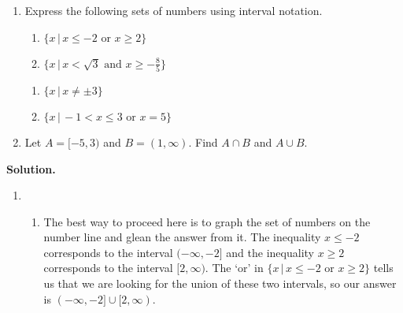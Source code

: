 \documentclass{ximera}
\begin{document}
\begin{example} \label{intervalex} $~$

\begin{enumerate} \item Express the following sets of numbers using interval notation.

\begin{multicols}{2}

\begin{enumerate}

\item  $\{ x \, | \, x \leq -2 \, \, \text{or} \, \,  x \geq 2 \}$

\item  $\{ x \, | \, x < \sqrt{3} \,\,  \text{and} \,\, x \geq -\frac{8}{5}  \}$

\setcounter{HW}{\value{enumii}}

\end{enumerate}

\end{multicols}

\begin{multicols}{2}

\begin{enumerate}

\setcounter{enumii}{\value{HW}}

\item  $\{ x \, | \, x \neq \pm 3 \}$

\item  $\{ x \, | \, -1 < x \leq 3 \,\, \text{or} \,\, x = 5\}$

\end{enumerate}

\end{multicols}

\item  Let $A = [-5,3)$ and $B = (1, \infty)$.  Find  $A \cap B$ and $A\cup B$. 

\end{enumerate}


{\bf Solution.}

\begin{enumerate}

\item 

\begin{enumerate}

\item  The best way to proceed here is to graph the set of numbers on the number line and glean the answer from it.  The inequality $x \leq -2$ corresponds to the interval $(-\infty, -2]$ and the inequality $x \geq 2$ corresponds to the interval $[2, \infty)$. The `or' in $\{ x \, | \, x \leq -2 \, \, \text{or} \, \,  x \geq 2 \}$ tells us that we are looking for the union of these two intervals, so our answer is $(-\infty, -2] \cup [2, \infty)$.


\end{enumerate}
\end{enumerate}
\end{example}
\end{document}
